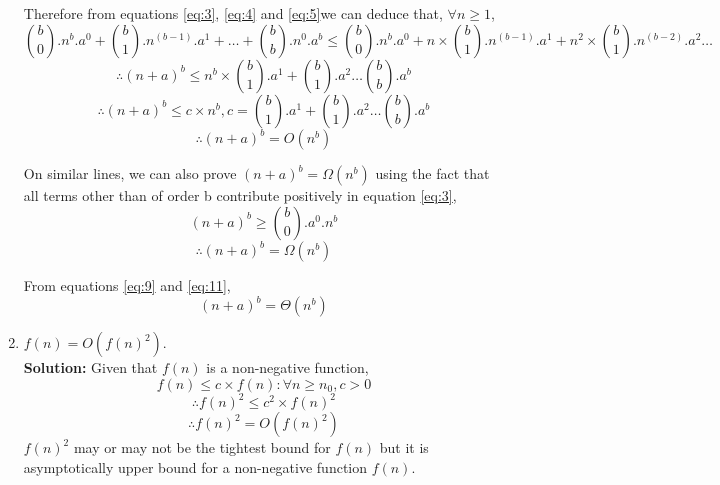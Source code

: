 \documentclass[11pt]{article}
\begin{document}
\begin{enumerate}
	Therefore from equations \ref{eq:3}, \ref{eq:4} and \ref{eq:5}we can deduce that, $\forall n \geq 1$, \\
	\begin{equation} \label{eq:6}
		{b \choose 0}.n^{b}.a^0 + {b \choose 1}.n^{(b-1)}.a^1 + \ldots + {b \choose b}.n^{0}.a^b \le {b \choose 0}.n^{b}.a^0 +  n \times {b \choose 1}.n^{(b-1)}.a^1 + n^{2} \times {b \choose 1}.n^{(b-2)}.a^{2} \ldots
	\end{equation}
	\begin{equation} \label{eq:7}
		\therefore (n+a)^b \le n^{b} \times {b \choose 1}.a^1 + {b \choose 1}.a^{2} \ldots {b \choose b}.a^{b}
		\end{equation}
	\begin{equation} \label{eq:8}
		\therefore (n+a)^b \le c \times n^{b}, c = {b \choose 1}.a^1 + {b \choose 1}.a^{2} \ldots {b \choose b}.a^{b}
	\end{equation}
	\begin{equation} \label{eq:9}
		\boxed{\therefore (n+a)^b = O(n^{b})}
	\end{equation}
	
	On similar lines, we can also prove $(n+a)^b=\Omega(n^b)$ using the fact that all terms other than of order b contribute positively in equation \ref{eq:3},
	\begin{equation} \label{eq:10}
		(n+a)^b \ge {b \choose 0}.a^0.n^{b}
	\end{equation}
	\begin{equation} \label{eq:11}
		\boxed{\therefore (n+a)^b=\Omega(n^b)}
	\end{equation}
	
	From equations \ref{eq:9} and \ref{eq:11},
	\begin{equation} \label{eq:12}
		\boxed{(n+a)^b=\Theta(n^b)}
	\end{equation}
	
    \item $f(n)=O(f(n)^2)$. \\
    \textbf{Solution:}
   	Given that $f(n)$ is a non-negative function,
    \begin{equation} \label{eq:13}
		f(n) \le  c \times f(n) : \forall n \ge n_0, c > 0
    \end{equation}
    \begin{equation} \label{eq:14}
		\therefore f(n)^2 \le  c^2 \times f(n)^2
	\end{equation}
	\begin{equation} \label{eq:15}
		\boxed{\therefore f(n)^2 =  O(f(n)^2)}
	\end{equation}
	$f(n)^2$ may or may not be the tightest bound for $f(n)$ but it is asymptotically upper bound for a non-negative function $f(n)$.
	

\end{enumerate}
\end{document}
